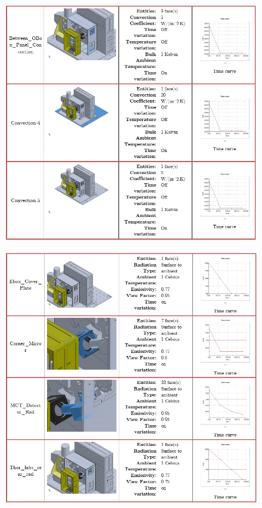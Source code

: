 \begin{figure}
    \centering
    \includegraphics[width=\textwidth]{thermal_load_images/ascent_pt1_TL_images/ascesnt_pt1_9.PNG}
\end{figure}

\begin{figure}
    \centering
    \includegraphics[width=\textwidth]{thermal_load_images/ascent_pt1_TL_images/ascesnt_pt1_10.PNG}
\end{figure}

